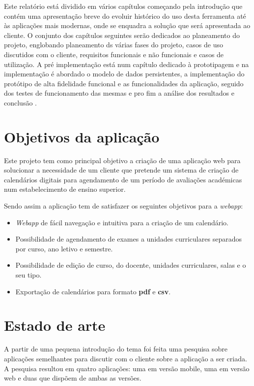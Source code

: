 \documentclass[11pt, twoside]{report}
\begin{document}
	Este relatório está dividido em vários capítulos começando pela introdução que contém uma apresentação breve do evoluir histórico do uso desta ferramenta até às aplicações mais modernas, onde se enquadra a solução que será apresentada ao cliente.
	O conjunto dos capítulos seguintes serão dedicados ao planeamento do projeto, englobando planeamento ds várias fases do projeto, casos de uso discutidos com o cliente, requisitos funcionais e não funcionais e casos de utilização.
	A pré implementação está num capítulo dedicado à prototipagem e na implementação é abordado o modelo de dados persistentes, a implementação do protótipo de alta fidelidade funcional e as funcionalidades da aplicação, seguido dos testes de funcionamento das mesmas e pro fim a análise dos resultados e conclusão .
	
	\section{Objetivos da aplicação}
	
	Este projeto tem como principal objetivo a criação de uma aplicação web para solucionar a necessidade de um cliente que pretende um sistema de criação de calendários digitais para agendamento de um período de avaliações académicas num estabelecimento de ensino superior. 
	
	Sendo assim a aplicação tem de satisfazer os seguintes objetivos para a \textit{webapp}: 
	\begin{itemize} 
		\item \textit{Webapp} de fácil navegação e intuitiva para a criação de um calendário. 
		\item Possibilidade de agendamento de exames a unidades curriculares separados por curso, ano letivo e semestre.   
		\item Possibilidade de edição de curso, do docente, unidades curriculares, salas e o seu tipo. 
		\item Exportação de calendários para formato \textbf{pdf} e \textbf{csv}. 
	\end{itemize} 
	\section{Estado de arte}
	\label{estadodearte}
	
	A partir de uma pequena introdução do tema foi feita uma pesquisa sobre aplicações semelhantes para discutir com o cliente sobre a aplicação a ser criada. A pesquisa resultou em quatro aplicações: uma em versão mobile, uma em versão web e duas que dispõem de ambas as versões.
	
\end{document}
